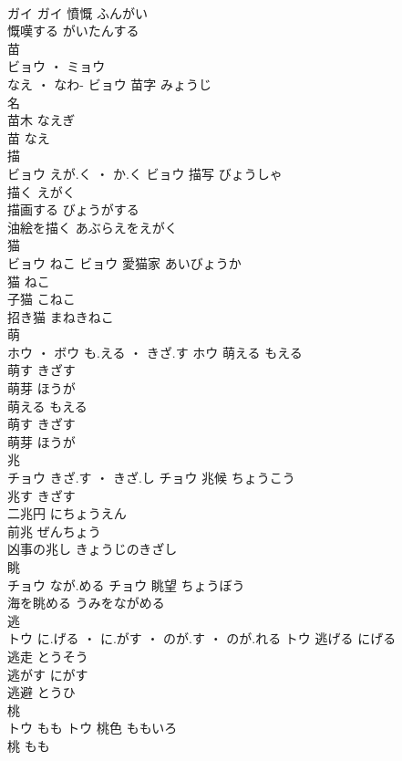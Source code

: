\documentclass[8pt]{extreport}
\begin{document}
\begin{CJK}{UTF8}{min}
\\	ガイ		ガイ	憤慨	ふんがい	
\\	慨嘆する	がいたんする	
\\	苗	
\\	ビョウ ・ ミョウ
\\	なえ ・ なわ-	ビョウ	苗字	みょうじ	
\\	名 
\\	苗木	なえぎ	
\\	苗	なえ	
\\	描	
\\	ビョウ	えが.く ・ か.く	ビョウ	描写	びょうしゃ	
\\	描く	えがく	
\\	描画する	びょうがする	
\\	油絵を描く	あぶらえをえがく	
\\	猫	
\\	ビョウ	ねこ	ビョウ	愛猫家	あいびょうか	
\\	猫	ねこ	
\\	子猫	こねこ	
\\	招き猫	まねきねこ	
\\	萌	
\\	ホウ ・ ボウ	も.える ・ きざ.す	ホウ	萌える	もえる	
\\	萌す	きざす	
\\	萌芽	ほうが	
\\	萌える	もえる	
\\	萌す	きざす	
\\	萌芽	ほうが	
\\	兆	
\\	チョウ	きざ.す ・ きざ.し	チョウ	兆候	ちょうこう	
\\	兆す	きざす	
\\	二兆円	にちょうえん	
\\	前兆	ぜんちょう	
\\	凶事の兆し	きょうじのきざし	
\\	眺	
\\	チョウ	なが.める	チョウ	眺望	ちょうぼう	
\\	海を眺める	うみをながめる	
\\	逃	
\\	トウ	に.げる ・ に.がす ・ のが.す ・ のが.れる	トウ	逃げる	にげる	
\\	逃走	とうそう	
\\	逃がす	にがす	
\\	逃避	とうひ	
\\	桃	
\\	トウ	もも	トウ	桃色	ももいろ	
\\	桃	もも	

\end{CJK}
\end{document}
